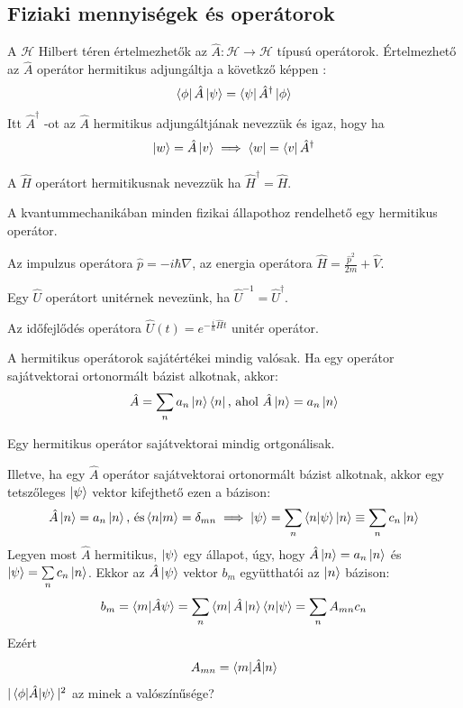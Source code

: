\subsection{Fiziaki mennyiségek és operátorok}
A $\mathcal{H}$ Hilbert téren értelmezhetők az $\hat{A} : \mathcal{H} \rightarrow \mathcal{H}$  típusú operátorok.
Értelmezhető az $\hat{A}$ operátor hermitikus adjungáltja a követkző képpen :
\begin{equation}
    \bra \phi \hat{A} \ket \psi = \bra \psi \hat{A}^\dag \ket \phi
\end{equation}
Itt $\hat{A}^\dag$ -ot az $\hat{A}$ hermitikus adjungáltjának nevezzük és igaz, hogy ha
\begin{equation}
    \ket w = \hat{A}\ket v \implies \bra w = \bra v \hat{A}^\dag
\end{equation}

\begin{def*}
    A $\hat{H}$ operátort hermitikusnak nevezzük ha $\hat H^\dag = \hat H$.
\end{def*}

\begin{theorem*}
    A kvantummechanikában minden fizikai állapothoz rendelhető egy hermitikus operátor.
\end{theorem*}

\begin{pld*}
    Az impulzus operátora $\hat p = -i\hbar \nabla$, az energia operátora $\hat H = \frac{\hat p^2}{2m} + \hat V$.
\end{pld*}

\begin{def*}
    Egy $\hat U$ operátort unitérnek nevezünk, ha $\hat U^{-1} = \hat U ^\dag$.
\end{def*}

\begin{pld*}
    Az időfejlődés operátora $\hat U(t) = e^{-\frac{i}{\hbar}\hat H t}$ unitér operátor.
\end{pld*}

A hermitikus operátorok sajátértékei mindig valósak. Ha egy operátor sajátvektorai ortonormált bázist alkotnak, akkor:
$$ \hat A = \sum\limits_{n} a_n \ket n \bra n \textrm{, ahol } \hat A \ket n = a_n \ket n $$
\begin{theorem*}
    Egy hermitikus operátor sajátvektorai mindig ortgonálisak.
\end{theorem*}
Illetve, ha egy $\hat A$ operátor sajátvektorai ortonormált bázist alkotnak, akkor egy tetszőleges $\ket \psi$ vektor
kifejthető ezen a bázison:
$$\hat A \ket n = a_n \ket n \textrm{, és} \braket{n|m} = \delta_{mn} \implies \ket\psi = \sum\limits_n \braket{n|\psi} \ket n 
\equiv  \sum\limits_n c_n \ket n$$ 
Legyen most $\hat A$ hermitikus, $\ket\psi$ egy állapot, úgy, hogy $\hat A \ket n = a_n\ket n$ és $\ket\psi = \sum\limits_n c_n \ket n$.
Ekkor az $\hat A \ket\psi$ vektor $b_m$ együtthatói az $\ket n$ bázison:
$$b_m = \braket{m|\hat A \psi} = \sum\limits_n \bra{m} \hat A \ket n \braket{n|\psi} = \sum\limits_n A_{mn}c_n$$
Ezért $$A_{mn} = \braket{ m |\hat A | n }$$
$|\braket{ \phi | \hat A | \psi}|^2$ az minek a valószínűsége?

